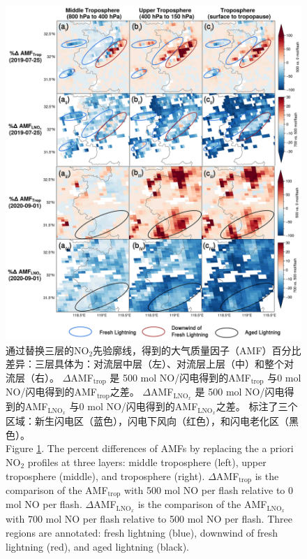 \begin{figure}[!htbp]
    \centering
    \includegraphics[width=12cm]{./figures/china_s5p_amf_diff.png}
    \caption{
    通过替换三层的NO$_2$先验廓线，得到的大气质量因子（AMF）百分比差异：三层具体为：对流层中层（左）、对流层上层（中）和整个对流层（右）。
     $\Delta$AMF$_\textrm{trop}$ 是 500 mol NO/闪电得到的AMF$_\textrm{trop}$ 与0 mol NO/闪电得到的AMF$_\textrm{trop}$之差。
     $\Delta$AMF$_\textrm{LNO$_x$}$ 是 500 mol NO/闪电得到的AMF$_\textrm{LNO$_x$}$ 与0 mol NO/闪电得到的AMF$_\textrm{LNO$_x$}$之差。
     标注了三个区域：新生闪电区（蓝色），闪电下风向（红色），和闪电老化区（黑色）。\\
    Figure \ref{fig:china_s5p_amf_diff}. The percent differences of AMFs by replacing the a priori NO$_2$ profiles at three layers:
    middle troposphere (left), upper troposphere (middle), and troposphere (right).
    $\Delta$AMF$_\textrm{trop}$ is the comparison of the AMF$_\textrm{trop}$ with 500 mol NO per flash relative to 0 mol NO per flash.
    $\Delta$AMF$_\textrm{LNO$_x$}$ is the comparison of the AMF$_\textrm{LNO$_x$}$ with 700 mol NO per flash relative to 500 mol NO per flash.
    Three regions are annotated: fresh lightning (blue),
    downwind of fresh lightning (red),
    and aged lightning (black).
    }
    \label{fig:china_s5p_amf_diff}
\end{figure}


